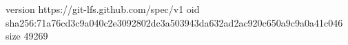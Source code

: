 version https://git-lfs.github.com/spec/v1
oid sha256:71a76cd3c9a040c2e3092802dc3a503943da632ad2ac920c650a9c9a0a41c046
size 49269
